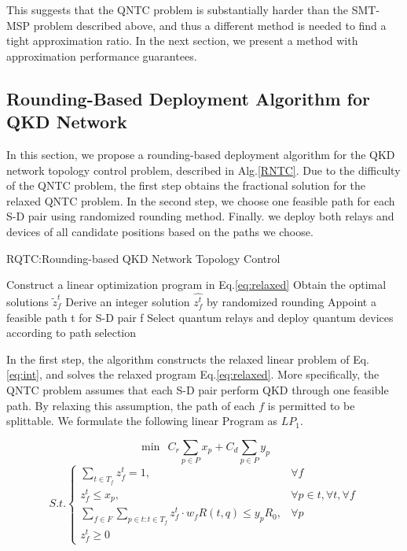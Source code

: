 This suggests that the QNTC problem is substantially harder than the SMT-MSP problem described above, and thus a different method is needed to find a tight approximation ratio. In the next section, we present a method with approximation performance guarantees.


\subsection{Rounding-Based Deployment Algorithm for QKD Network}
In this section, we propose a rounding-based deployment algorithm for the QKD network topology control problem, described in Alg.\ref{RNTC}. Due to the difficulty of the QNTC problem, the first step obtains the fractional solution for the relaxed QNTC problem. In the second step, we choose one feasible path for each S-D pair using randomized rounding method. Finally. we deploy both relays and devices of all candidate positions based on the paths we choose.

\begin{algorithm}[h]\label{RQTC}
\caption{RQTC:Rounding-based QKD Network Topology Control}
\begin{algorithmic}[1]
\STATE  Construct a linear optimization program in Eq.\ref{eq:relaxed}
\STATE Obtain the optimal solutions $\widetilde{z}_f^t$
\STATE Derive an integer solution $\hat{z_f^t}$ by randomized rounding
\STATE Appoint a feasible path t for S-D pair f
\ENDIF
\ENDFOR
\ENDFOR
\STATE Select quantum relays and deploy quantum devices according to path selection
\end{algorithmic}
\end{algorithm}

In the first step, the algorithm constructs the relaxed linear problem of Eq.\ref{eq:int}, and solves the relaxed program Eq.\ref{eq:relaxed}. More specifically, the QNTC problem assumes that each S-D pair perform QKD through one feasible path. By relaxing this assumption, the path of each $f$ is permitted to be splittable. We formulate the following linear Program as $LP_1$.

{\small
	\begin{equation*}
	\min \ \  C_r\sum_{p \in P}{x_p} + C_d\sum_{p \in P}{y_p}
	\end{equation*}
	\begin{equation}\label{eq:relaxed}
	{S.t.}\begin{cases}
     \sum_{t \in T_f}{z_f^t} = 1, & \forall f \\
     z_f^t \le x_p, & \forall p \in t, \forall t , \forall f \\
     \sum_{f \in F}\sum_{p \in t:t \in T_f}{z_f^t \cdot w_f R(t,q)} \le  y_p R_0, & \forall p  \\
     z_f^t \ge 0
	\end{cases}
	\end{equation}
}

